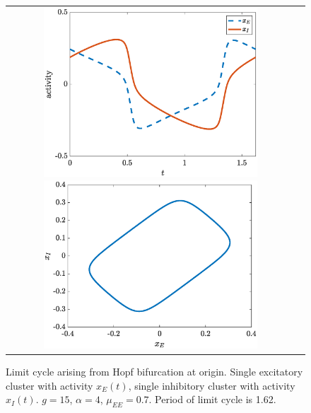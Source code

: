 \documentclass[11pt,reqno]{amsart}
\begin{document}
\begin{figure}
    \centering
    \begin{tabular}{cc}
    \includegraphics[width=8cm]{images/limitcycle1.eps}
    \includegraphics[width=8cm]{images/limitcycle2.eps}
    \end{tabular}
    \caption{Limit cycle arising from Hopf bifurcation at origin. Single excitatory cluster with activity $x_E(t)$, single inhibitory cluster with activity $x_I(t)$. $g = 15$, $\alpha = 4$, $\mu_{EE}= 0.7$. Period of limit cycle is 1.62.} 
    \label{fig:limitcycleorigin}
\end{figure}
\end{document}
